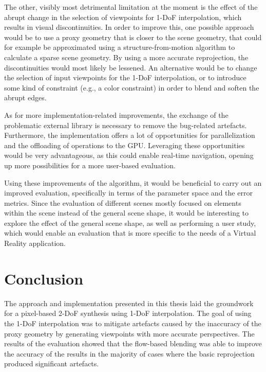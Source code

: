 The other, visibly most detrimental limitation at the moment is the effect of the abrupt change in the selection of viewpoints for 1-DoF interpolation, which results in visual discontinuities.  
In order to improve this, one possible approach would be to use a proxy geometry that is closer to the scene geometry, that could for example be approximated using a structure-from-motion algorithm to calculate a sparse scene geometry. By using a more accurate reprojection, the discontinuities would most likely be lessened. An alternative would be to change the selection of input viewpoints for the 1-DoF interpolation, or to introduce some kind of constraint (e.g., a color constraint) in order to blend and soften the abrupt edges.

As for more implementation-related improvements, the exchange of the problematic external library is necessary to remove the bug-related artefacts. Furthermore, the implementation offers a lot of opportunities for parallelization and the offloading of operations to the GPU. Leveraging these opportunities would be very advantageous, as this could enable real-time navigation, opening up more possibilities for a more user-based evaluation.

Using these improvements of the algorithm, it would be beneficial to carry out an improved evaluation, specifically in terms of the parameter space and the error metrics. Since the evaluation of different scenes mostly focused on elements within the scene instead of the general scene shape, it would be interesting to explore the effect of the general scene shape, as well as performing a user study, which would enable an evaluation that is more specific to the needs of a Virtual Reality application.

\section{Conclusion} \label{sec:conclusion}

The approach and implementation presented in this thesis laid the groundwork for a pixel-based 2-DoF synthesis using 1-DoF interpolation. 
The goal of using the 1-DoF interpolation was to mitigate artefacts caused by the inaccuracy of the proxy geometry by generating viewpoints with more accurate perspectives.
The results of the evaluation showed that the flow-based blending was able to improve the accuracy of the results in the majority of cases where the basic reprojection produced significant artefacts.

